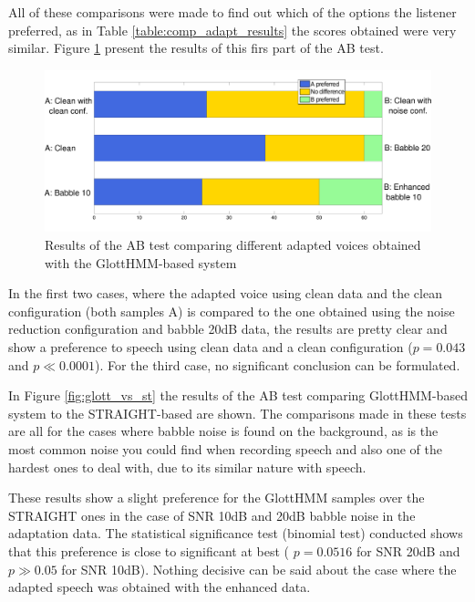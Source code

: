 All of these comparisons were made to find out which of the options the listener preferred, as in Table \ref{table:comp_adapt_results} the scores obtained were very similar.
%
Figure \ref{fig:glott_vs_glott} present the results of this firs part of the AB test.

\begin{figure}[!htb]
  \begin{centering}
  \includegraphics[width=\textwidth]{images/glott_vs_glott.pdf}
  \caption{Results of the AB test comparing different adapted voices obtained with the GlottHMM-based system}
  \label{fig:glott_vs_glott}
  \end{centering}
\end{figure}

In the first two cases, where the adapted voice using clean data and the clean configuration (both samples A) is compared to the one obtained using the noise reduction configuration and babble 20dB data, the results are pretty clear and show a preference to speech using clean data and a clean configuration ($p = 0.043$ and $p \ll 0.0001$).
%
For the third case, no significant conclusion can be formulated.

In Figure \ref{fig:glott_vs_st} the results of the AB test comparing GlottHMM-based system to the STRAIGHT-based are shown.
%
The comparisons made in these tests are all for the cases where babble noise is found on the background, as is the most common noise you could find when recording speech and also one of the hardest ones to deal with, due to its similar nature with speech.

These results show a slight preference for the GlottHMM samples over the STRAIGHT ones in the case of SNR 10dB and 20dB babble noise in the adaptation data.
%
The statistical significance test (binomial test) conducted shows that this preference is close to significant at best ( $p = 0.0516$ for SNR 20dB and $p \gg 0.05$ for SNR 10dB).
%
Nothing decisive can be said about the case where the adapted speech was obtained with the enhanced data.

